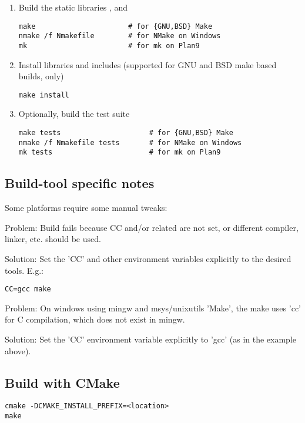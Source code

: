 \begin{enumerate}
\item Build the static libraries ,  and 
\begin{lstlisting}
make                      # for {GNU,BSD} Make
nmake /f Nmakefile        # for NMake on Windows
mk                        # for mk on Plan9
\end{lstlisting}

\item Install libraries and includes (supported for GNU and BSD make based builds, only)
\begin{lstlisting}
make install 
\end{lstlisting}

\item Optionally, build the test suite
\begin{lstlisting}
make tests                     # for {GNU,BSD} Make
nmake /f Nmakefile tests       # for NMake on Windows
mk tests                       # for mk on Plan9
\end{lstlisting}%
\end{enumerate}

\subsection{Build-tool specific notes}

Some platforms require some manual tweaks:

Problem: Build fails because CC and/or related are not set, or different compiler,
linker, etc. should be used.

Solution: Set the 'CC' and other environment variables explicitly to the desired
tools. E.g.:

\begin{lstlisting}
CC=gcc make
\end{lstlisting}


Problem: On windows using mingw and msys/unixutils 'Make', the make uses
'cc' for C compilation, which does not exist in mingw.

Solution: Set the 'CC' environment variable explicitly to 'gcc' (as in
the example above).

\subsection{Build with CMake}

\begin{lstlisting}
cmake -DCMAKE_INSTALL_PREFIX=<location>
make
\end{lstlisting}


